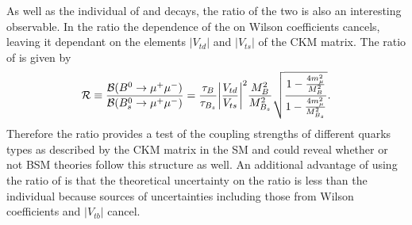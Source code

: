 {As well as the individual \BFs of \bdmumu and \bsmumu decays, the ratio of the two \BFs is also an interesting observable. 
In the ratio the dependence of the \BFs on Wilson coefficients cancels, leaving it dependant on the elements $|V_{td}|$ and $|V_{ts}|$ of the CKM matrix. The ratio of \BFs is given by 
\begin{equation}
  \mathcal{R} \equiv \frac{\mathcal{B}(B^{0} \to \mu^{+} \mu^{-})}{\mathcal{B}(B^{0}_{s}\to \mu^{+} \mu^{-})} = \frac{\tau_{B}}{\tau_{B_{s}}}
 \bigg{|} \frac{V_{td}}{V_{ts}} \bigg{|}^{2} \frac{M_{B}^{2}}{M_{B_{s}}^{2}} \sqrt{\frac{1 - \frac{4m_{\mu}^{2}}{M^{2}_{B}}}{1- \frac{4m_{\mu}^{2}}{M^{2}_{B_{s}}}}}.
\label{eq:BF_ratio}
\end{equation}
Therefore the ratio provides a test of the coupling strengths of different quarks types as described by the CKM matrix in the SM and could reveal whether or not BSM theories follow this structure as well. 
An additional advantage of using the ratio of \BFs is that the theoretical uncertainty on the ratio is less than the individual \BFs because sources of uncertainties including those from Wilson coefficients and $|V_{tb}|$ cancel.



}

